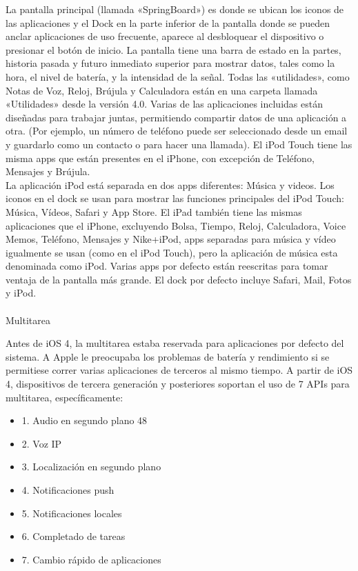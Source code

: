	La pantalla principal (llamada «SpringBoard») es donde se ubican los iconos de las aplicaciones y el Dock en la parte inferior de la pantalla donde se pueden anclar aplicaciones de uso frecuente, aparece al desbloquear el dispositivo o presionar el botón de inicio. La pantalla tiene una barra de estado en la partes, historia pasada y futuro inmediato superior para mostrar datos, tales como la hora, el nivel de batería, y la intensidad de la señal. Todas las «utilidades», como Notas de Voz, Reloj, Brújula y Calculadora están en una carpeta llamada «Utilidades» desde la versión 4.0. Varias de las aplicaciones incluidas están diseñadas para trabajar juntas, permitiendo compartir datos de una aplicación a otra. (Por ejemplo, un número de teléfono puede ser seleccionado desde un email y guardarlo como un contacto o para hacer una llamada). El iPod Touch tiene las misma apps que están presentes en el iPhone, con excepción de Teléfono, Mensajes y Brújula.\\ 
	
	La aplicación iPod está separada en dos apps diferentes: Música y videos. Los iconos en el dock se usan para mostrar las funciones principales del iPod Touch: Música, Vídeos, Safari y App Store. El iPad también tiene las mismas aplicaciones que el iPhone, excluyendo Bolsa, Tiempo, Reloj, Calculadora, Voice Memos, Teléfono, Mensajes y Nike+iPod, apps separadas para música y vídeo igualmente se usan (como en el iPod Touch), pero la aplicación de música esta denominada como iPod. Varias apps por defecto están reescritas para tomar ventaja de la pantalla más grande. El dock por defecto incluye Safari, Mail, Fotos y iPod.\\ \\
	Multitarea 
	
	Antes de iOS 4, la multitarea estaba reservada para aplicaciones por defecto del sistema. A Apple le preocupaba los problemas de batería y rendimiento si se permitiese correr varias aplicaciones de terceros al mismo tiempo. A partir de iOS 4, dispositivos de tercera generación y posteriores soportan el uso de 7 APIs para multitarea, específicamente:  \cite{14}
	\begin{itemize}
		\item 1. Audio en segundo plano 48
		\item 2. Voz IP
		\item 3. Localización en segundo plano
		\item 4. Notificaciones push
		\item 5. Notificaciones locales
		\item 6. Completado de tareas
		\item 7. Cambio rápido de aplicaciones
	\end{itemize}
	
